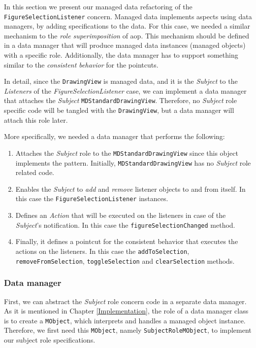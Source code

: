 In this section we present our managed data refactoring of the \texttt{FigureSelectionListener} concern.
Managed data implements aspects using data managers, by adding specifications to the data.
For this case, we needed a similar mechanism to the \textit{role superimposition} of \ac{aop}.
This mechanism should be defined in a data manager that will produce managed data instances (managed objects) with a specific role.
Additionally, the data manager has to support something similar to the \textit{consistent behavior} for the pointcuts.

In detail, since the \texttt{DrawingView} is managed data, and it is the \textit{Subject} to the \textit{Listeners} of the \textit{FigureSelectionListener} case, we can implement a data manager that attaches the \textit{Subject} \texttt{MDStandardDrawingView}.
Therefore, no \textit{Subject} role specific code will be tangled with the \texttt{DrawingView}, but a data manager will attach this role later.

More specifically, we needed a data manager that performs the following:

\begin{enumerate}
	\item Attaches the \textit{Subject} role to the \texttt{MDStandardDrawingView} since this object implements the pattern.
	Initially, \texttt{MDStandardDrawingView} has no \textit{Subject} role related code.

	\item Enables the \textit{Subject} to \textit{add} and \textit{remove} listener objects to and from itself. 
	\newline
	In this case the \texttt{FigureSelectionListener} instances.

	\item Defines an \textit{Action} that will be executed on the listeners in case of the \textit{Subject}'s notification.
	\newline
	In this case the \texttt{figureSelectionChanged} method.

	\item Finally, it defines a pointcut for the consistent behavior that executes the actions on the listeners. 
	In this case the \texttt{addToSelection}, \texttt{removeFromSelection}, \texttt{toggleSelection} and \texttt{clearSelection} methods.
\end{enumerate}

\subsubsection{Data manager}
First, we can abstract the \textit{Subject} role concern code in a separate data manager.
As it is mentioned in Chapter \ref{Implementation}, the role of a data manager class is to create a \texttt{MObject}, which interprets and handles a managed object instance.
Therefore, we first need this \texttt{MObject}, namely \texttt{SubjectRoleMObject}, to implement our subject role specifications.


